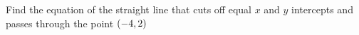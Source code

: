 
%
%
%
%      
% 
% 
%   



\gcalcexpr[0]{\vbthree}{\vbone + \vbtwo}

\question[4] Find the equation of the straight line that cuts off equal $x$ and $y$ intercepts 
and passes through the point $(-4, 2)$


\watchout

\ifprintanswers
\fi 


